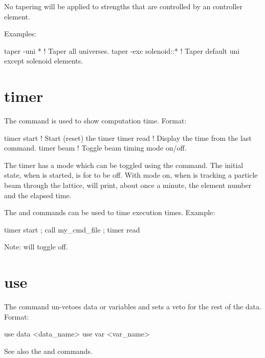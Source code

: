 {{{{{{{{{{{No tapering will be applied to strengths that are controlled by an  controller element.

Examples:
\begin{example}
  taper -uni *            ! Taper all universes.
  taper -exc solenoid::*  ! Taper default uni except solenoid elements.
\end{example}


\section{timer}
\label{s:timer}

The  command is used to show computation time. Format:
\begin{example}
  timer start      ! Start (reset) the timer
  timer read       ! Display the time from the last  command.    
  timer beam       ! Toggle beam timing mode on/off.
\end{example}
The timer has a  mode which can be toggled using the  command. The
initial state, when \tao is started, is for  to be off. With  mode
on, when \tao is tracking a particle beam through the lattice, \tao will print, about once a minute,
the element number and the elapsed time.

The  and  commands can be used to time execution
times. Example:
\begin{example}
  timer start ; call my_cmd_file ; timer read
\end{example}

Note:  will toggle  off.

\section{use}
\label{s:use}

The  command un-vetoes data or variables and sets a veto for the rest of the
data. Format:
\begin{example}
  use data  <data_name>
  use var <var_name>
\end{example}

\vskip 7pt 

See also the  and  commands.

}}}}}}}}}}}
